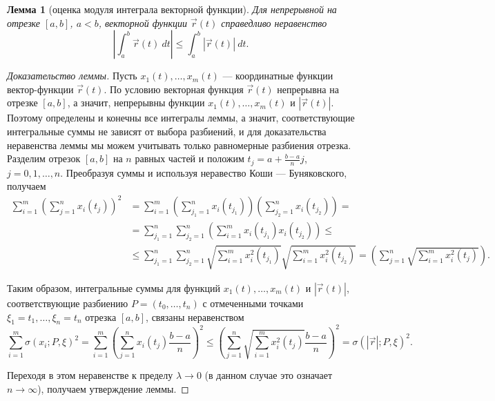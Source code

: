 \documentclass[12pt]{report}
\numberwithin{equation}{section}
\newtheorem{lemma}{Лемма}[section]
\begin{document}
\begin{lemma}[оценка модуля интеграла векторной функции] \label{lemm:19:1}
Для непрерывной на отрезке $[a,b]$, $a < b$, векторной функции $\vec{r}(t)$ справедливо неравенство
\[ \left| \int_a^b \vec{r}(t)~dt \right| \leqslant \int_a^b |\vec{r}(t)|~dt.\]
\end{lemma}
\begin{proof}[Доказательство леммы] Пусть $x_1(t),\ldots,x_m(t)$ --- координатные функции вектор-функции $\vec{r}(t)$. По условию векторная функция $\vec{r}(t)$ непрерывна на отрезке $[a,b]$, а значит, непрерывны функции $x_1(t), \ldots, x_m(t)$ и $|\vec{r}(t)|$. Поэтому определены и конечны все интегралы леммы, а значит, соответствующие интегральные суммы не зависят от выбора разбиений, и для доказательства неравенства леммы мы можем учитывать только равномерные разбиения отрезка. Разделим отрезок $[a,b]$ на $n$ равных частей и положим $t_j = a + \frac{b-a}{n}j$, $j = 0,1,\ldots,n$. Преобразуя суммы и используя неравество Коши --- Буняковского, получаем
\[
\begin{aligned}
\sum_{i=1}^m \left( \sum_{j=1}^n x_i(t_j) \right)^2&= \sum_{i=1}^m\left( \sum_{j_1 = 1}^n x_i (t_{j_1}) \right) \left( \sum_{j_2 = 1}^n x_i (t_{j_2}) \right) =\\
&= \sum_{j_1 = 1}^n \sum_{j_2 = 1}^n \left( \sum_{i=1}^m x_i (t_{j_1}) x_i (t_{j_2}) \right) \leqslant\\
&\leqslant \sum_{j_1 = 1}^n \sum_{j_2 = 1}^n \sqrt{\sum_{i=1}^m x_i^2 (t_{j_1})} \sqrt{\sum_{i=1}^m x_i^2 (t_{j_2})} = \left( \sum_{j=1}^n \sqrt{\sum_{i=1}^m x_i^2 (t_j)}\right).
\end{aligned}\]

Таким образом, интегральные суммы для функций $x_1(t), \ldots, x_m(t)$ и $|\vec{r}(t)|$, соответствующие разбиению $P = (t_0, \ldots, t_n)$ с отмеченными точками $\xi_1 = t_1, \ldots, \xi_n = t_n$ отрезка $[a,b]$, связаны неравенством
\[\sum_{i=1}^m \sigma(x_i; P, \xi)^2 = \sum_{i=1}^m \left( \sum_{j=1}^n x_i (t_j) \frac{b-a}{n}\right)^2 \leqslant \left( \sum_{j=1}^n \sqrt{\sum_{i=1}^m x_i^2 (t_j)} \frac{b-a}{n}\right)^2 = \sigma(|\vec{r}|; P, \xi)^2.\]

Переходя в этом неравенстве к пределу $\lambda \to 0$ (в данном случае это означает $n \to \infty$), получаем утверждение леммы.
\end{proof}
\end{document}
